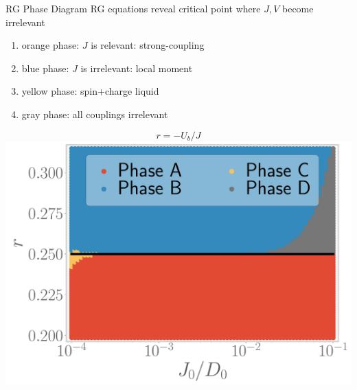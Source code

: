 \documentclass[8pt,aspectratio=169]{beamer}
\begin{document}
\begin{frame}{RG Phase Diagram}
RG equations reveal critical point where \(J,V\) \alert{become irrelevant}\\[10pt]

\hspace*{-20pt}
\begin{minipage}{0.52\textwidth}
\begin{enumerate}
	\item orange phase: \(J\) is relevant: strong-coupling\\[20pt]
	\item blue phase: \(J\) is irrelevant: local moment\\[20pt]
	\item yellow phase: spin+charge liquid\\[20pt]
	\item gray phase: all couplings irrelevant
\end{enumerate}
\end{minipage}
\begin{minipage}{0.5\textwidth}
	\[r = -U_b/J\]
	\includegraphics[width=\textwidth]{phase-map-MIT.pdf}
\end{minipage}

\end{frame}
\end{document}
